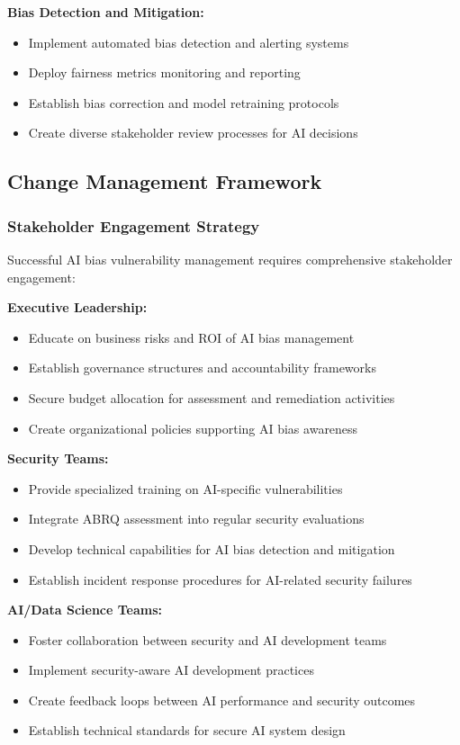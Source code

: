 \documentclass[11pt,a4paper]{article}
\begin{document}
\textbf{Bias Detection and Mitigation:}
\begin{itemize}
\item Implement automated bias detection and alerting systems
\item Deploy fairness metrics monitoring and reporting
\item Establish bias correction and model retraining protocols
\item Create diverse stakeholder review processes for AI decisions
\end{itemize}

\subsection{Change Management Framework}

\subsubsection{Stakeholder Engagement Strategy}

Successful AI bias vulnerability management requires comprehensive stakeholder engagement:

\textbf{Executive Leadership:}
\begin{itemize}
\item Educate on business risks and ROI of AI bias management
\item Establish governance structures and accountability frameworks
\item Secure budget allocation for assessment and remediation activities
\item Create organizational policies supporting AI bias awareness
\end{itemize}

\textbf{Security Teams:}
\begin{itemize}
\item Provide specialized training on AI-specific vulnerabilities
\item Integrate ABRQ assessment into regular security evaluations
\item Develop technical capabilities for AI bias detection and mitigation
\item Establish incident response procedures for AI-related security failures
\end{itemize}

\textbf{AI/Data Science Teams:}
\begin{itemize}
\item Foster collaboration between security and AI development teams
\item Implement security-aware AI development practices
\item Create feedback loops between AI performance and security outcomes
\item Establish technical standards for secure AI system design
\end{itemize}
\end{document}
